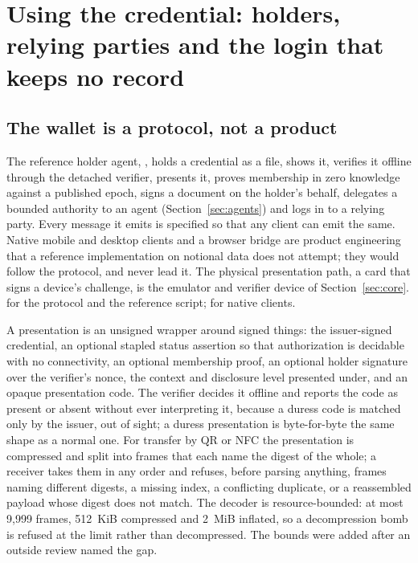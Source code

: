 \section{Using the credential: holders, relying parties and the login that keeps no record}
\label{sec:use}



\subsection{The wallet is a protocol, not a product}

The reference holder agent, , holds a credential as a file, shows
it, verifies it offline through the detached verifier, presents it, proves membership in zero
knowledge against a published epoch, signs a document on the holder's behalf, delegates a bounded
authority to an agent (Section~\ref{sec:agents}) and logs in to a relying party. Every message it
emits is specified so that any client can emit the same. Native mobile and desktop clients and a
browser bridge are product engineering that a reference implementation on notional data does not
attempt; they would follow the protocol, and never lead it. The physical presentation path, a card
that signs a device's challenge, is the emulator and verifier device of Section~\ref{sec:core}.
\sImplMark{} for the protocol and the reference script; \sFut{} for native clients.

A presentation is an unsigned wrapper around signed things: the issuer-signed credential, an
optional stapled status assertion so that authorization is decidable with no connectivity, an
optional membership proof, an optional holder signature over the verifier's nonce, the context and
disclosure level presented under, and an opaque presentation code. The verifier decides it offline
and reports the code as present or absent without ever interpreting it, because a duress code is
matched only by the issuer, out of sight; a duress presentation is byte-for-byte the same shape as a
normal one. For transfer by QR or NFC the presentation is compressed and split into frames that each
name the digest of the whole; a receiver takes them in any order and refuses, before parsing
anything, frames naming different digests, a missing index, a conflicting duplicate, or a
reassembled payload whose digest does not match. The decoder is resource-bounded: at most 9,999
frames, 512~KiB compressed and 2~MiB inflated, so a decompression bomb is refused at the limit rather
than decompressed. The bounds were added after an outside review named the gap. \sImpl

